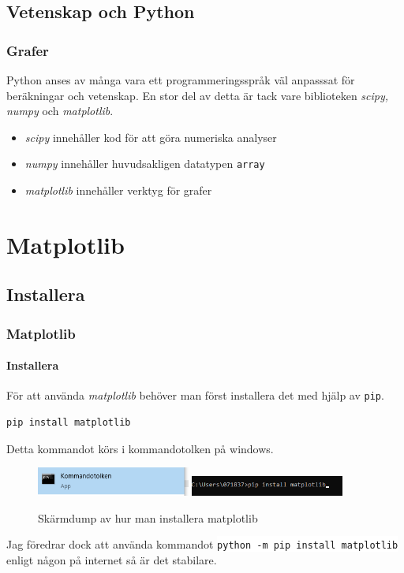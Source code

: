 \documentclass[aspectratio=169]{beamer}
\newcommand{\code}[1]{\colorbox{white}{\lstinline{#1}}}
\begin{document}
\subsection{Vetenskap och Python}

\begin{frame}
\frametitle{Grafer}

Python anses av många vara ett programmeringsspråk väl anpasssat för beräkningar och vetenskap. En stor del av detta är tack vare biblioteken \textit{scipy, numpy} och \textit{matplotlib}.

\begin{itemize}
	\item \textit{scipy} innehåller kod för att göra numeriska analyser\\
	\item \textit{numpy} innehåller huvudsakligen datatypen \texttt{array}\\
	\item \textit{matplotlib} innehåller verktyg för grafer
\end{itemize}

\end{frame}

\section{Matplotlib}

\subsection{Installera}

\begin{frame}[fragile]
\frametitle{Matplotlib}
\framesubtitle{Installera}

För att använda \textit{matplotlib} behöver man först installera det med hjälp av \texttt{pip}.

\begin{lstlisting}
pip install matplotlib
\end{lstlisting}

Detta kommandot körs i kommandotolken på windows.

\begin{figure}
	\includegraphics[width=0.45\textwidth]{cmd.PNG}
	\includegraphics[width=0.45\textwidth]{cmd2.PNG}
	\caption{Skärmdump av hur man installera matplotlib}
\end{figure}

Jag föredrar dock att använda kommandot \code{python -m pip install matplotlib} enligt någon på internet så är det stabilare.

\end{frame}
\end{document}
